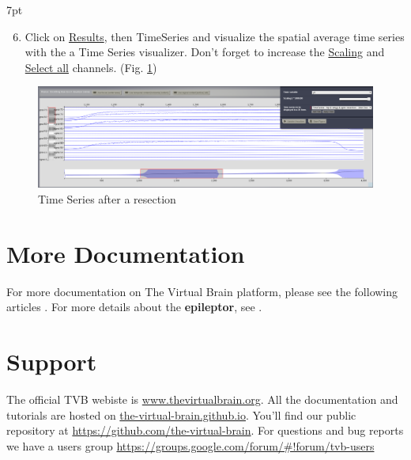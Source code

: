 \documentclass{tufte-handout}
\newenvironment{simulation}{%
  \def\FrameCommand{%
    \hspace{1pt}%
    {\color{ForestGreen}\vrule width 2pt}%
    {\color{simulationshade}\vrule width 4pt}%
    \colorbox{simulationshade}%
  }%
  \MakeFramed{\advance\hsize-\width\FrameRestore}%
  \noindent\hspace{-4.55pt}%
  \begin{adjustwidth}{}{7pt}%
  \vspace{2pt}\vspace{2pt}%
}
{%
  \vspace{2pt}\end{adjustwidth}\endMakeFramed%
}
\begin{document}
\begin{simulation}
  \begin{enumerate}
    \setcounter{enumi}{5}
  \item Click on \underline{Results}, then TimeSeries and visualize the spatial average time series with the a Time Series visualizer.
  Don't forget to increase the \underline{Scaling} and \underline{Select all} channels. (Fig. \ref{fig:ts_resec})
  \end{enumerate}
\end{simulation}

\begin{figure}[h]
  \includegraphics[width=\linewidth]{Handout_UI_ModellingAnEpilepticPatient_TimeSeriesResection}%
  \caption{Time Series after a resection}%
  \label{fig:ts_resec}%
\end{figure}


\section{More Documentation}\label{sec:more-doc}
For more documentation on The Virtual Brain platform, please see the following articles \citep{Sanz-Leon_2013, Woodman_2014}. For more details about the \textbf{epileptor}, see  \citep{Jirsa_2014}.


\section{Support}\label{sec:support}

The official TVB webiste is \url{www.thevirtualbrain.org}.  
All the documentation and tutorials are hosted on \url{the-virtual-brain.github.io}.
You'll find our public  repository at \url{https://github.com/the-virtual-brain}. For questions and bug reports we have a users group \url{https://groups.google.com/forum/#!forum/tvb-users}



\end{document}
